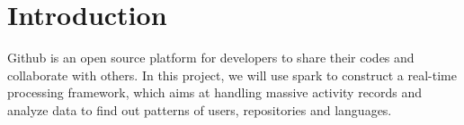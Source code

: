 \section{Introduction}

Github is an open source platform for developers to share their codes and collaborate with others. In this project, we will use spark to construct a real-time processing framework, which aims at handling massive activity records and analyze data to find out patterns of users, repositories and languages. 